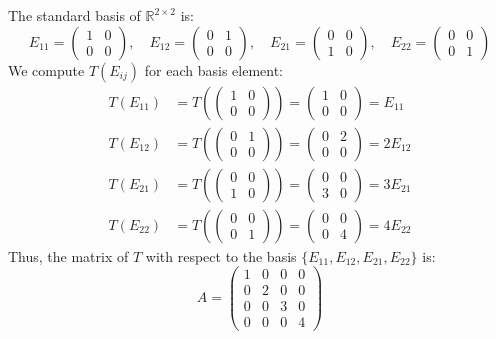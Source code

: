 \documentclass{article}
\begin{document}
The standard basis of \( \mathbb{R}^{2 \times 2} \) is:
\[
   E_{11} = \begin{pmatrix} 1 & 0 \\ 0 & 0 \end{pmatrix}, \quad
   E_{12} = \begin{pmatrix} 0 & 1 \\ 0 & 0 \end{pmatrix}, \quad
   E_{21} = \begin{pmatrix} 0 & 0 \\ 1 & 0 \end{pmatrix}, \quad
   E_{22} = \begin{pmatrix} 0 & 0 \\ 0 & 1 \end{pmatrix}
\]
We compute \( T(E_{ij}) \) for each basis element:
\begin{align*}
   T(E_{11}) &= T\left(\begin{pmatrix} 1 & 0 \\ 0 & 0 \end{pmatrix}\right) = \begin{pmatrix} 1 & 0 \\ 0 & 0 \end{pmatrix} = E_{11} \\
   T(E_{12}) &= T\left(\begin{pmatrix} 0 & 1 \\ 0 & 0 \end{pmatrix}\right) = \begin{pmatrix} 0 & 2 \\ 0 & 0 \end{pmatrix} = 2E_{12} \\
   T(E_{21}) &= T\left(\begin{pmatrix} 0 & 0 \\ 1 & 0 \end{pmatrix}\right) = \begin{pmatrix} 0 & 0 \\ 3 & 0 \end{pmatrix} = 3E_{21} \\
   T(E_{22}) &= T\left(\begin{pmatrix} 0 & 0 \\ 0 & 1 \end{pmatrix}\right) = \begin{pmatrix} 0 & 0 \\ 0 & 4 \end{pmatrix} = 4E_{22}
\end{align*}
Thus, the matrix of \( T \) with respect to the basis \( \{E_{11}, E_{12}, E_{21}, E_{22}\} \) is:
\[
   A = \begin{pmatrix}
       1 & 0 & 0 & 0 \\
       0 & 2 & 0 & 0 \\
       0 & 0 & 3 & 0 \\
       0 & 0 & 0 & 4
   \end{pmatrix}
\]
\end{document}
